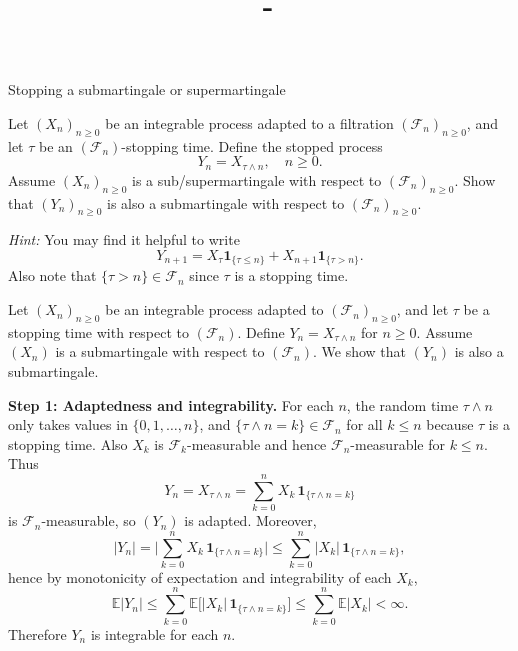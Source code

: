 \documentclass[answers,12pt,addpoints]{exam}
\author{\name}
\title{\course\ - \assignment}
\begin{document}
\maketitle

\newpage

\begin{questions}

\question Stopping a submartingale or supermartingale

Let \((X_n)_{n \ge 0}\) be an integrable process adapted to a filtration \((\mathcal{F}_n)_{n \ge 0}\), and let \(\tau\) be an \((\mathcal{F}_n)\)-stopping time. Define the stopped process
\[
Y_n = X_{\tau \wedge n}, \quad n \ge 0.
\]
Assume \((X_n)_{n \ge 0}\) is a sub/supermartingale with respect to \((\mathcal{F}_n)_{n \ge 0}\). Show that \((Y_n)_{n \ge 0}\) is also a submartingale with respect to \((\mathcal{F}_n)_{n \ge 0}\).

\medskip

\textit{Hint:} You may find it helpful to write
\[
Y_{n+1} = X_{\tau} \mathbf{1}_{\{\tau \le n\}} + X_{n+1} \mathbf{1}_{\{\tau > n\}}.
\]
Also note that \(\{\tau > n\} \in \mathcal{F}_n\) since \(\tau\) is a stopping time. 

\begin{solution}
Let $(X_n)_{n\ge 0}$ be an integrable process adapted to $(\mathcal{F}_n)_{n\ge 0}$, and let $\tau$ be a stopping time with respect to $(\mathcal{F}_n)$. Define $Y_n = X_{\tau \wedge n}$ for $n \ge 0$. Assume $(X_n)$ is a submartingale with respect to $(\mathcal{F}_n)$. We show that $(Y_n)$ is also a submartingale.

\medskip

\textbf{Step 1: Adaptedness and integrability.}
For each $n$, the random time $\tau \wedge n$ only takes values in $\{0,1,\dots,n\}$, and $\{\tau \wedge n = k\} \in \mathcal{F}_n$ for all $k \le n$ because $\tau$ is a stopping time. Also $X_k$ is $\mathcal{F}_k$-measurable and hence $\mathcal{F}_n$-measurable for $k \le n$. Thus
\[
Y_n 
= X_{\tau \wedge n}
= \sum_{k=0}^n X_k \, \mathbf{1}_{\{\tau \wedge n = k\}}
\]
is $\mathcal{F}_n$-measurable, so $(Y_n)$ is adapted. Moreover,
\[
|Y_n|
= \bigg|\sum_{k=0}^n X_k \, \mathbf{1}_{\{\tau \wedge n = k\}}\bigg|
\le \sum_{k=0}^n |X_k| \, \mathbf{1}_{\{\tau \wedge n = k\}},
\]
hence by monotonicity of expectation and integrability of each $X_k$,
\[
\mathbb{E}|Y_n|
\le \sum_{k=0}^n \mathbb{E}\big[|X_k| \, \mathbf{1}_{\{\tau \wedge n = k\}}\big]
\le \sum_{k=0}^n \mathbb{E}|X_k|
< \infty.
\]
Therefore $Y_n$ is integrable for each $n$.


\end{solution}
\end{questions}
\end{document}
